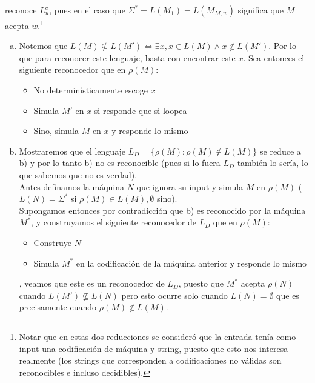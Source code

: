 \documentclass[dcc]{fcfmcourse}
\begin{document}
\begin{problems}
\begin{itemize}
\begin{itemize}
 \end{itemize}
 reconoce $L_{u}^c$, pues en el caso que $\Sigma^* = L(M_{1}) = L(M_{M,w})$ significa que $M$ acepta $w$.\footnote{Notar que en estas dos reducciones se consideró que la entrada tenía como input una codificación de máquina y string, puesto que esto nos interesa realmente (los strings que corresponden a codificaciones no válidas son reconocibles e incluso decidibles).}
 \end{itemize}
 \problem \begin{enumerate}[a)]
 \item Notemos que $L(M)\not \subseteq L(M') \Leftrightarrow \exists x,  x\in L(M) \land x\not\in L(M')$. Por lo que para reconocer este lenguaje, basta con encontrar este $x$. Sea entonces el siguiente reconocedor que en $\rho(M)$:
 \begin{itemize}
     \item No determinísticamente escoge $x$
     \item Simula $M'$ en $x$ si responde que si loopea
     \item Sino, simula $M$ en $x$ y responde lo mismo
 \end{itemize}
 \item Mostraremos que el lenguaje $L_{D} = \{\rho(M)\colon \rho(M)\not\in L(M)\}$ se reduce a b) y por lo tanto b) no es reconocible (pues si lo fuera $L_{D}$ también lo sería, lo que sabemos que no es verdad).\\ 
 Antes definamos la máquina $N$ que ignora su input y simula $M$ en $\rho(M)$ ($L(N) = \Sigma^*$ si $\rho(M) \in L(M), \emptyset$ sino).\\
 Supongamos entonces por contradicción que b) es reconocido por la máquina $M^*$, y construyamos el siguiente reconocedor de $L_{D}$ que en $\rho(M)$:
 \begin{itemize}
     \item Construye $N$
     \item Simula $M^*$ en la codificación de la máquina anterior y responde lo mismo
 \end{itemize}
 , veamos que este es un reconocedor de $L_{D}$, puesto que $M^*$ acepta $\rho(N)$ cuando $L(M') \not \subseteq L(N)$ pero esto ocurre solo cuando $L(N) = \emptyset$ que es precisamente cuando $\rho(M) \not \in L(M)$.
 \end{enumerate}
\end{problems}
\end{document}
